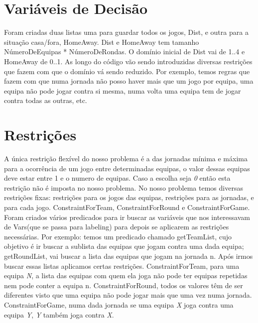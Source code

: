 \documentclass[runningheads,a4paper]{llncs}
\begin{document}
\section{Variáveis de Decisão}
Foram criadas duas listas uma para guardar todos os jogos, Dist, e outra para a situação casa/fora, HomeAway. Dist e HomeAway tem tamanho NúmeroDeEquipas * NúmeroDeRondas. O domínio inicial de Dist vai de 1..4 e HomeAway de 0..1. As longo do código vão sendo introduzidas diversas restrições que fazem com que o domínio vá sendo reduzido. Por exemplo, temos regras que fazem com que numa jornada não posso haver mais que um jogo por equipa, uma equipa não pode jogar contra si mesma, numa volta uma equipa tem de jogar contra todas as outras, etc.

\section{Restrições}
A única restrição flexível do nosso problema é a das jornadas mínima e máxima para a ocorrência de um jogo entre determinadas equipas, o valor dessas equipas deve estar entre 1 e o numero de equipas. Caso a escolha seja \textit{0} então esta restrição não é imposta no nosso problema. No nosso problema temos diversas restrições fixas: restrições para os jogos das equipas, restrições para as jornadas, e para cada jogo. ConstraintForTeam, ConstraintForRound e ConstraintForGame. Foram criados vários predicados para ir buscar as variáveis que nos interessavam de Vars(que se passa para labeling) para depois se aplicarem as restrições necessárias. Por exemplo: temos um predicado chamado getTeamList, cujo objetivo é ir buscar a sublista das equipas que jogam contra uma dada equipa; getRoundList, vai buscar a lista das equipas que jogam na jornada n. Após irmos buscar essas listas aplicamos certas restrições. ConstraintForTeam, para uma equipa \textit{N}, a lista das equipas com quem ela joga não pode ter equipas repetidas nem pode conter a equipa n. ConstraintForRound, todos os valores têm de ser diferentes visto que uma equipa não pode jogar mais que uma vez numa jornada. ConstraintForGame, numa dada jornada se uma equipa \textit{X} joga contra uma equipa \textit{Y}, \textit{Y} também joga contra \textit{X}.

\end{document}
